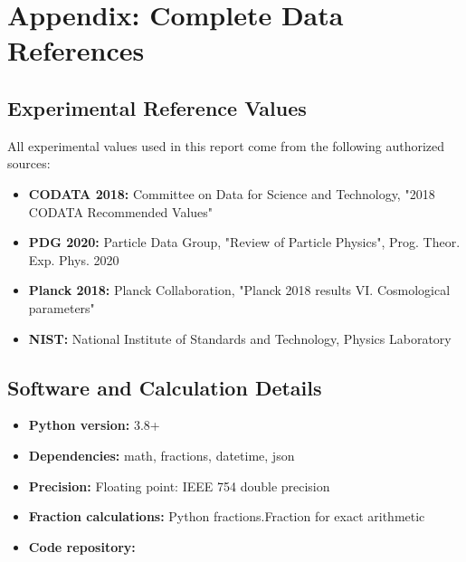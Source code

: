 	\section{Appendix: Complete Data References}
	
	\subsection{Experimental Reference Values}
	
	All experimental values used in this report come from the following authorized sources:
	
	\begin{itemize}
		\item \textbf{CODATA 2018:} Committee on Data for Science and Technology, "2018 CODATA Recommended Values"
		\item \textbf{PDG 2020:} Particle Data Group, "Review of Particle Physics", Prog. Theor. Exp. Phys. 2020
		\item \textbf{Planck 2018:} Planck Collaboration, "Planck 2018 results VI. Cosmological parameters"
		\item \textbf{NIST:} National Institute of Standards and Technology, Physics Laboratory
	\end{itemize}
	
	\subsection{Software and Calculation Details}
	
	\begin{itemize}
		\item \textbf{Python version:} 3.8+
		\item \textbf{Dependencies:} math, fractions, datetime, json
		\item \textbf{Precision:} Floating point: IEEE 754 double precision
		\item \textbf{Fraction calculations:} Python fractions.Fraction for exact arithmetic
		\item \textbf{Code repository:} 
	\end{itemize}
